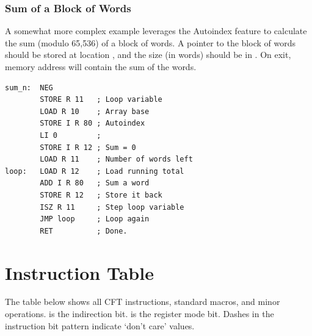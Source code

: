 \subsubsection{Sum of a Block of Words}

A somewhat more complex example leverages the Autoindex feature to
calculate the sum (modulo 65,536) of a block of words. A pointer to
the block of words should be stored at location , and the
size (in words) should be in \A. On exit, memory address 
will contain the sum of the words.

\begin{lstlisting}[language=cftasm]
sum_n:  NEG
        STORE R 11   ; Loop variable
        LOAD R 10    ; Array base
        STORE I R 80 ; Autoindex
        LI 0         ; 
        STORE I R 12 ; Sum = 0
        LOAD R 11    ; Number of words left
loop:   LOAD R 12    ; Load running total
        ADD I R 80   ; Sum a word
        STORE R 12   ; Store it back
        ISZ R 11     ; Step loop variable
        JMP loop     ; Loop again
        RET          ; Done.
\end{lstlisting}





\section{Instruction Table}

The table below shows all CFT instructions, standard macros, and minor
operations.  is the indirection bit.  is the register mode
bit. Dashes in the instruction bit pattern indicate ‘don't care’ values.

